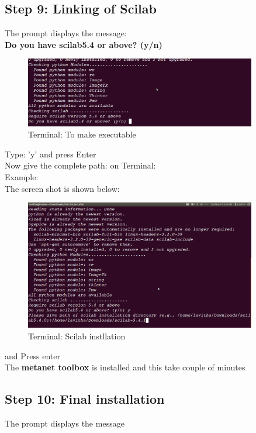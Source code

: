 \subsection {Step 9: Linking of Scilab}
The prompt displays the message:\\
\textbf{Do you have scilab5.4 or above? (y/n)}\\
\begin{figure}[h]
\centering
\includegraphics[width=0.9\textwidth]{figures/install6.png}
\caption{Terminal: To make executable}
\label{Terminal: make executable}
\end{figure}
\newpage
Type: 'y' and press Enter\\
Now give the complete path:
on Terminal:\\
Example:
\textbf{}\\
The screen shot is shown below:\\
\begin{figure}[h]
\centering
\includegraphics[width=0.9\textwidth]{figures/install7.png}
\caption{Terminal: Scilab instllation}
\label{Terminal: make executable}
\end{figure}
and Press enter\\
The \textbf{metanet toolbox} is installed and this take couple of minutes\\
\subsection {Step 10: Final installation}
The prompt displays the message

